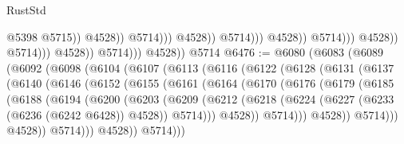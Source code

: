 \begin{lexlean}{RustStd}
\begin{coremodule}
                                                              @5398
                                                              @5715))
                                                          @4528))
                                                      @5714)))
                                                @4528))
                                            @5714)))
                                      @4528))
                                  @5714)))
                            @4528))
                        @5714)))
                  @4528))
              @5714)))
        @4528))
    @5714
@6476 := @6080
    (@6083
      (@6089
        (@6092
          (@6098
            (@6104
              (@6107
                (@6113
                  (@6116
                    (@6122
                      (@6128
                        (@6131
                          (@6137
                            (@6140
                              (@6146
                                (@6152
                                  (@6155
                                    (@6161
                                      (@6164
                                        (@6170
                                          (@6176
                                            (@6179
                                              (@6185
                                                (@6188
                                                  (@6194
                                                    (@6200
                                                      (@6203
                                                        (@6209
                                                          (@6212
                                                            (@6218
                                                              (@6224
                                                                (@6227
                                                                  (@6233
                                                                    (@6236 (@6242 @6428))
                                                                    @4528))
                                                                @5714)))
                                                          @4528))
                                                      @5714)))
                                                @4528))
                                            @5714)))
                                      @4528))
                                  @5714)))
                            @4528))
                        @5714)))

\end{coremodule}
\end{lexlean}

